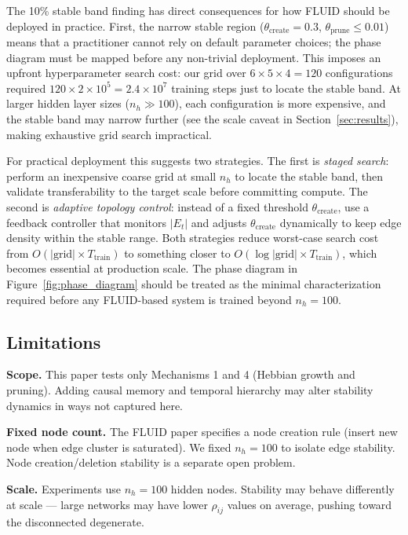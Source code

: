 \documentclass[12pt]{article}
\begin{document}
The 10\% stable band finding has direct consequences for how FLUID should be deployed in practice. First, the narrow stable region ($\theta_{\text{create}} = 0.3$, $\theta_{\text{prune}} \leq 0.01$) means that a practitioner cannot rely on default parameter choices; the phase diagram must be mapped before any non-trivial deployment. This imposes an upfront hyperparameter search cost: our grid over $6 \times 5 \times 4 = 120$ configurations required $120 \times 2 \times 10^5 = 2.4 \times 10^7$ training steps just to locate the stable band. At larger hidden layer sizes ($n_h \gg 100$), each configuration is more expensive, and the stable band may narrow further (see the scale caveat in Section~\ref{sec:results}), making exhaustive grid search impractical.

For practical deployment this suggests two strategies. The first is \emph{staged search}: perform an inexpensive coarse grid at small $n_h$ to locate the stable band, then validate transferability to the target scale before committing compute. The second is \emph{adaptive topology control}: instead of a fixed threshold $\theta_{\text{create}}$, use a feedback controller that monitors $|E_t|$ and adjusts $\theta_{\text{create}}$ dynamically to keep edge density within the stable range. Both strategies reduce worst-case search cost from $O(|\text{grid}| \times T_{\text{train}})$ to something closer to $O(\log|\text{grid}| \times T_{\text{train}})$, which becomes essential at production scale. The phase diagram in Figure~\ref{fig:phase_diagram} should be treated as the minimal characterization required before any FLUID-based system is trained beyond $n_h = 100$.

\subsection{Limitations}

\textbf{Scope.} This paper tests only Mechanisms 1 and 4 (Hebbian growth and pruning). Adding causal memory and temporal hierarchy may alter stability dynamics in ways not captured here.

\textbf{Fixed node count.} The FLUID paper specifies a node creation rule (insert new node when edge cluster is saturated). We fixed $n_h = 100$ to isolate edge stability. Node creation/deletion stability is a separate open problem.

\textbf{Scale.} Experiments use $n_h = 100$ hidden nodes. Stability may behave differently at scale --- large networks may have lower $\rho_{ij}$ values on average, pushing toward the disconnected degenerate.
\end{document}
